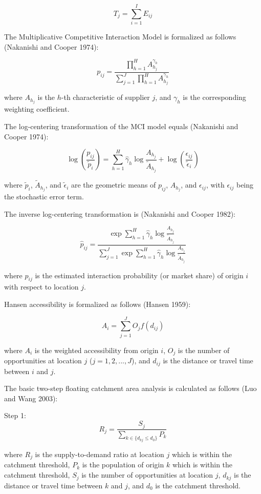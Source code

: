 \documentclass[
]{article}
\begin{document}
\[T_j = \sum_{i=1}^I E_{ij}\]

The Multiplicative Competitive Interaction Model is formalized as
follows (Nakanishi and Cooper 1974):

\[p_{ij} = \frac{\prod_{h=1}^H A_{h_j}^{\gamma_h}}{\sum_{j=1}^J \prod_{h=1}^H A_{h_j}^{\gamma_h}}\]

where \(A_{h_j}\) is the \(h\)-th characteristic of supplier \(j\), and
\(\gamma_h\) is the corresponding weighting coefficient.

The log-centering transformation of the MCI model equals (Nakanishi and
Cooper 1974):

\[\log \left(\frac{p_{ij}}{\widetilde{p}_i} \right) = \sum_{h=1}^H \hat{\gamma}_h \log \frac{A_{h_j}}{\widetilde{A}_{h_j}} + \log \left( \frac{\epsilon_{ij}}{\widetilde{\epsilon}_i} \right)\]

where \(\widetilde{p}_{i}\), \(\widetilde{A}_{h_j}\), and
\(\widetilde{\epsilon}_{i}\) are the geometric means of \(p_{ij}\),
\(A_{h_j}\), and \(\epsilon_{ij}\), with \(\epsilon_{ij}\) being the
stochastic error term.

The inverse log-centering transformation is (Nakanishi and Cooper 1982):

\[\hat{p}_{ij} = \frac{\exp{\sum_{h=1}^H \hat{\gamma}_h \log \frac{A_{h_j}}{\widetilde{A}_{h_j}}}} {\sum_{j=1}^J \exp{\sum_{h=1}^H \hat{\gamma}_h \log \frac{A_{h_j}}{\widetilde{A}_{h_j}}}}\]

where \(\hat{p}_{ij}\) is the estimated interaction probability (or
market share) of origin \(i\) with respect to location \(j\).

Hansen accessibility is formalized as follows (Hansen 1959):

\[A_i = \sum_{j=1}^J O_j f(d_{ij})\]

where \(A_i\) is the weighted accessibility from origin \(i\), \(O_j\)
is the number of opportunities at location \(j\) (\(j=1,2,...,J\)), and
\(d_{ij}\) is the distance or travel time between \(i\) and \(j\).

The basic two-step floating catchment area analysis is calculated as
follows (Luo and Wang 2003):

Step 1: \[R_j = \frac{S_j}{\sum_{k \in \{d_{kj} \leq d_0\}} P_k}\]

where \(R_j\) is the supply-to-demand ratio at location \(j\) which is
within the catchment threshold, \(P_k\) is the population of origin
\(k\) which is within the catchment threshold, \(S_j\) is the number of
opportunities at location \(j\), \(d_{kj}\) is the distance or travel
time between \(k\) and \(j\), and \(d_0\) is the catchment threshold.
\end{document}

